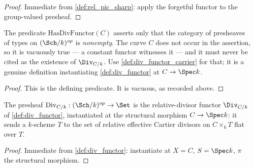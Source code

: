 \begin{proof}\leanok
  Immediate from \cref{def:rel_pic_sharp}: apply the forgetful functor to
  the group-valued presheaf.
\end{proof}

\begin{definition}
  \label{def:has_div_functor}
  The predicate \(\mathrm{HasDivFunctor}(C)\) asserts only that the category of
  presheaves of types on \((\Sch/k)^{op}\) is \emph{nonempty}. The curve \(C\)
  does not occur in the assertion, so it is vacuously true --- a constant functor
  witnesses it --- and it must never be cited as the existence of
  \(\Div_{C/k}\). Use \cref{def:div_functor_carrier} for that; it is a genuine
  definition instantiating \cref{def:div_functor} at \(C \to \Spec k\).
\end{definition}

\begin{proof}
  This is the defining predicate. It is vacuous, as recorded above.
\end{proof}

\begin{definition}\leanok
  \label{def:div_functor_carrier}
  The presheaf \(\mathrm{Div}_{C/k} : (\Sch/k)^{op} \to \Set\) is the
  relative-divisor functor \(\Div_{C/k}\) of \cref{def:div_functor},
  instantiated at the structural morphism \(C \to \Spec k\): it sends a
  \(k\)-scheme \(T\) to the set of relative effective Cartier divisors on
  \(C \times_k T\) flat over \(T\).
\end{definition}

\begin{proof}\leanok
  Immediate from \cref{def:div_functor}: instantiate at
  \(X = C\), \(S = \Spec k\), \(\pi\) the structural morphism.
\end{proof}

